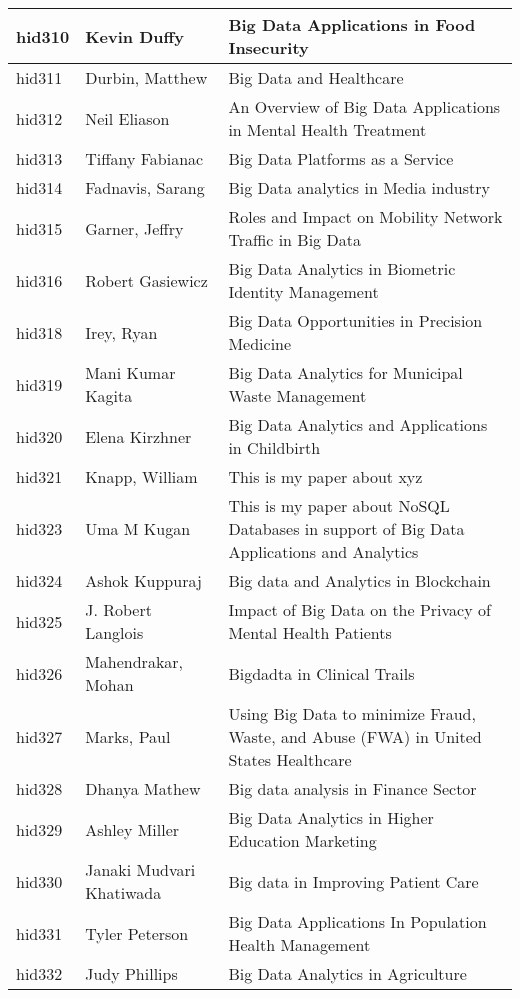 \documentclass[12pt]{book}
\begin{document}
\begin{footnotesize}
\begin{longtable}{|p{1cm}p{5cm}p{9cm}|}
\hline
hid310 & Kevin Duffy & Big Data Applications in Food Insecurity  \\
\hline
hid311 & Durbin, Matthew & Big Data and Healthcare  \\
\hline
hid312 & Neil Eliason & An Overview of Big Data Applications in Mental Health Treatment  \\
\hline
hid313 & Tiffany Fabianac & Big Data Platforms as a Service  \\
\hline
hid314 & Fadnavis, Sarang & Big Data analytics in Media industry  \\
\hline
hid315 & Garner, Jeffry & Roles and Impact on Mobility Network Traffic in Big Data  \\
\hline
hid316 & Robert Gasiewicz & Big Data Analytics in Biometric Identity Management  \\
\hline
hid318 & Irey, Ryan & Big Data Opportunities in Precision Medicine  \\
\hline
hid319 & Mani Kumar Kagita & Big Data Analytics for Municipal Waste Management  \\
\hline
hid320 & Elena Kirzhner & Big Data Analytics and Applications in Childbirth  \\
\hline
hid321 & Knapp, William & This is my paper about xyz  \\
\hline
hid323 & Uma M Kugan & This is my paper about NoSQL Databases in support of Big Data Applications and Analytics  \\
\hline
hid324 & Ashok Kuppuraj & Big data and Analytics in Blockchain  \\
\hline
hid325 & J. Robert Langlois & Impact of Big Data on the Privacy of Mental Health Patients  \\
\hline
hid326 & Mahendrakar, Mohan & Bigdadta in Clinical Trails  \\
\hline
hid327 & Marks, Paul & Using Big Data to minimize Fraud, Waste, and Abuse (FWA) in United States Healthcare  \\
\hline
hid328 & Dhanya Mathew & Big data analysis in Finance Sector  \\
\hline
hid329 & Ashley Miller & Big Data Analytics in Higher Education Marketing  \\
\hline
hid330 & Janaki Mudvari Khatiwada & Big data in Improving Patient Care  \\
\hline
hid331 & Tyler Peterson & Big Data Applications In Population Health Management  \\
\hline
hid332 & Judy Phillips & Big Data Analytics in Agriculture  \\

\end{longtable}
\end{footnotesize}
\end{document}
